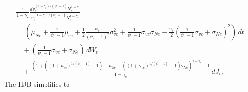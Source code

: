 \documentclass[12 pt, oneside]{article}
\theoremstyle{definition}
\theoremstyle{definition}
\theoremstyle{definition}
\begin{document}
\begin{align*}
& \frac{1}{1  - \gamma_e}  \frac{dv_e^{(1 - \gamma_e) / (\psi_e - 1)}N_e^{1 - \gamma_e}}{v_e^{(1 - \gamma_e) / (\psi_e - 1)}N_e^{1 - \gamma_e}} \\
& =  \left(\mu_{Ne} + \frac{1}{\psi_e - 1}\mu_{ve} + \frac{1}{2}\frac{\psi_e}{(\psi_e - 1)^2}\sigma_{ve}^2 + \frac{1}{\psi_e - 1}\sigma_{ve}\sigma_{Ne} - \frac{\gamma_e}{2} \left(\frac{1}{\psi_e - 1}\sigma_{ve} + \sigma_{Ne}\right)^2 \right)\, dt\\
                                          &\quad + \left(\frac{1}{\psi_e - 1}\sigma_{ve} + \sigma_{Ne}\right)\, dW_t \\
                                          &\quad + \frac{(1 +  ((1 + \kappa_{ve})^{1 / (\psi_e - 1)} - 1) - \kappa_{Ne} - ((1 + \kappa_{ve})^{1 / (\psi_e - 1)} - 1)\kappa_{Ne})^{1 - \gamma_e} - 1}{1 - \gamma_e}\, dJ_t.
\end{align*}
The HJB simplifies to
\end{document}
